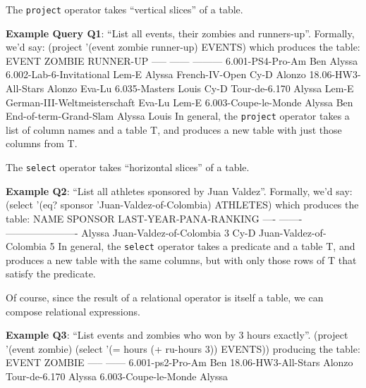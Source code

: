 The {\tt project} operator takes ``vertical slices'' of a table.

{\bf Example Query Q1}: ``List all events, their zombies and runners-up''. 
Formally, we'd say:
 \beginlisp
(project '(event zombie runner-up)
         EVENTS)
 \endlisp
 which produces the table:
 \beginlisp
EVENT                              ZOMBIE    RUNNER-UP
-----                              ------    ---------
6.001-PS4-Pro-Am                   Ben       Alyssa
6.002-Lab-6-Invitational           Lem-E     Alyssa
French-IV-Open                     Cy-D      Alonzo
18.06-HW3-All-Stars                Alonzo    Eva-Lu
6.035-Masters                      Louis     Cy-D
Tour-de-6.170                      Alyssa    Lem-E
German-III-Weltmeisterschaft       Eva-Lu    Lem-E
6.003-Coupe-le-Monde               Alyssa    Ben
End-of-term-Grand-Slam             Alyssa    Louis
 \endlisp
 In general, the {\tt project} operator takes a list of column names and a
table T, and produces a new table with just those columns from T.

The {\tt select} operator takes ``horizontal slices'' of a table.

{\bf Example Q2}: ``List all athletes sponsored by Juan Valdez''.  Formally,
we'd say:
 \beginlisp
(select '(eq? sponsor 'Juan-Valdez-of-Colombia)
        ATHLETES)
 \endlisp
 which produces the table:
 \beginlisp
NAME       SPONSOR                    LAST-YEAR-PANA-RANKING
----       -------                    ----------------------
Alyssa     Juan-Valdez-of-Colombia    3
Cy-D       Juan-Valdez-of-Colombia    5
 \endlisp
 In general, the {\tt select} operator takes a predicate and a table T, and
produces a new table with the same columns, but with only those rows of T
that satisfy the predicate.

Of course, since the result of a relational operator is itself a table, we
can compose relational expressions.

{\bf Example Q3}: ``List events and zombies who won by 3 hours exactly''.
 \beginlisp
(project '(event zombie)
    (select '(= hours (+ ru-hours 3))
        EVENTS))
 \endlisp
producing the table:
 \beginlisp
EVENT                            ZOMBIE
-----                            ------
6.001-ps2-Pro-Am                 Ben
18.06-HW3-All-Stars              Alonzo
Tour-de-6.170                    Alyssa
6.003-Coupe-le-Monde             Alyssa
 \endlisp


